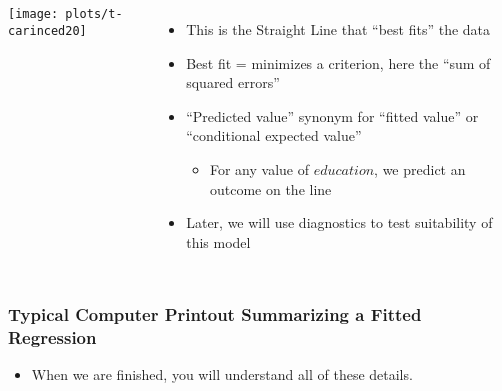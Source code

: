 \documentclass[10pt,english]{beamer}
\def\lyxframeend{} %
\newenvironment{topcolumns}{\begin{columns}[t]}{\end{columns}}
\def\Sweavesize{\normalsize}
\begin{document}
\lyxframeend{}

\begin{center}
\par\end{center}
\begin{topcolumns}%


\column{6cm}


\texttt{[image: plots/t-carinced20]}


\column{6cm}
\begin{itemize}
\item This is the Straight Line that ``best fits'' the data
\item Best fit = minimizes a criterion, here the ``sum of squared errors''
\item ``Predicted value'' synonym for ``fitted value'' or ``conditional
expected value''

\begin{itemize}
\item For any value of $education$, we predict an outcome on the line
\end{itemize}
\item Later, we will use diagnostics to test suitability of this model
\end{itemize}
\end{topcolumns}%

\lyxframeend{}

\begin{frame}
\frametitle{Typical Computer Printout Summarizing a Fitted Regression}

\begin{center}
\par\end{center}

\def\Sweavesize{\scriptsize}


\end{frame}


\lyxframeend{}


\begin{itemize}
\item When we are finished, you will understand all of these details.
\end{itemize}

\lyxframeend{}
\end{document}
